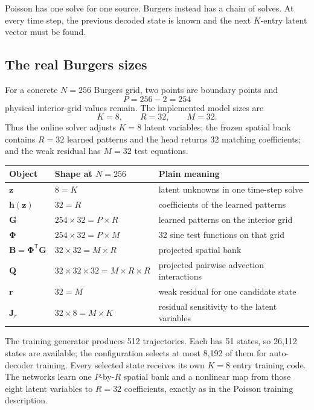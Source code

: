 \documentclass[11pt]{article}
\newcommand{\mat}[1]{\mathbf{#1}}
\newcommand{\vect}[1]{\mathbf{#1}}
\begin{document}
Poisson has one solve for one source.  Burgers instead has a chain of solves.
At every time step, the previous decoded state is known and the next $K$-entry
latent vector must be found.

\subsection{The real Burgers sizes}
\label{sec:burgers-sizes}

For a concrete $N=256$ Burgers grid, two points are boundary points and
\begin{equation}
  P=256-2=254
\end{equation}
physical interior-grid values remain.  The implemented model sizes are
\begin{equation}
  K=8,\qquad R=32,\qquad M=32.
\end{equation}
Thus the online solver adjusts $K=8$ latent variables; the frozen spatial bank
contains $R=32$ learned patterns and the head returns 32 matching
coefficients; and the weak residual has $M=32$ test equations.

\begin{center}
\begin{tabular}{@{}lll@{}}
\toprule
Object & Shape at $N=256$ & Plain meaning \\
\midrule
$\vect{z}$ & $8=K$ & latent unknowns in one time-step solve \\
$\vect{h}(\vect{z})$ & $32=R$ & coefficients of the learned patterns \\
$\mat{G}$ & $254\times32=P\times R$ & learned patterns on the interior grid \\
$\mat{\Phi}$ & $254\times32=P\times M$ & 32 sine test functions on that grid \\
$\mat{B}=\mat{\Phi}^{\mathsf T}\mat{G}$ & $32\times32=M\times R$ & projected spatial bank \\
$\mat{Q}$ & $32\times32\times32=M\times R\times R$ & projected pairwise advection interactions \\
$\vect{r}$ & $32=M$ & weak residual for one candidate state \\
$\mat{J}_r$ & $32\times8=M\times K$ & residual sensitivity to the latent variables \\
\bottomrule
\end{tabular}
\end{center}

The training generator produces 512 trajectories.  Each has 51 states, so
26,112 states are available; the configuration selects at most 8,192 of them
for auto-decoder training.  Every selected state receives its own $K=8$ entry
training code.  The networks learn one $P$-by-$R$ spatial bank and a nonlinear
map from those eight latent variables to $R=32$ coefficients, exactly as in
the Poisson training description.
\end{document}
